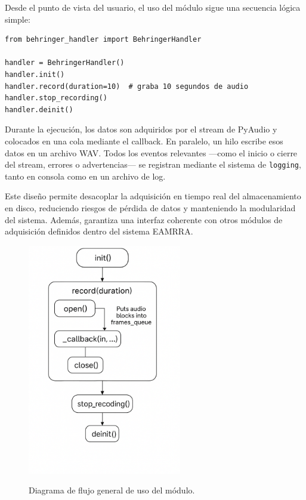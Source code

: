 Desde el punto de vista del usuario, el uso del módulo sigue una secuencia lógica simple:

\begin{verbatim}
from behringer_handler import BehringerHandler

handler = BehringerHandler()
handler.init()
handler.record(duration=10)  # graba 10 segundos de audio
handler.stop_recording()
handler.deinit()
\end{verbatim}

Durante la ejecución, los datos son adquiridos por el stream de PyAudio y colocados en una cola mediante el callback. En paralelo, un hilo escribe esos datos en un archivo WAV. Todos los eventos relevantes —como el inicio o cierre del stream, errores o advertencias— se registran mediante el sistema de \texttt{logging}, tanto en consola como en un archivo de log.

Este diseño permite desacoplar la adquisición en tiempo real del almacenamiento en disco, reduciendo riesgos de pérdida de datos y manteniendo la modularidad del sistema. Además, garantiza una interfaz coherente con otros módulos de adquisición definidos dentro del sistema EAMRRA.

\begin{figure}[htpb]
    \centering
    \includegraphics[width=0.6\textwidth]{graficos/workflow.png}
    \label{fig:workflow}
    \caption{Diagrama de flujo general de uso del módulo.}
\end{figure}




